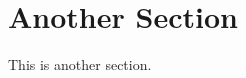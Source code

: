 \documentclass[../thesis/thesis.tex]{subfiles}
\begin{document}
\section{Another Section}


This is another section.

\lipsum[5-6]
\end{document}
